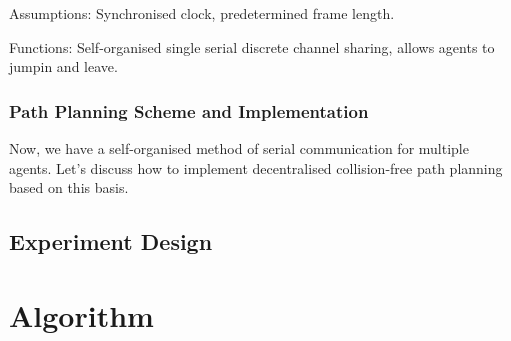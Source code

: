 {Assumptions: Synchronised clock, predetermined frame length.

Functions: Self-organised single serial discrete channel sharing, allows agents to jumpin and leave.


\subsection{Path Planning Scheme and Implementation}


Now, we have a self-organised method of serial communication for multiple agents. 
Let's discuss how to implement decentralised collision-free path planning based on this basis.




\section{Experiment Design}

}


\chapter{Algorithm}
\label{chap:Algorithm}

